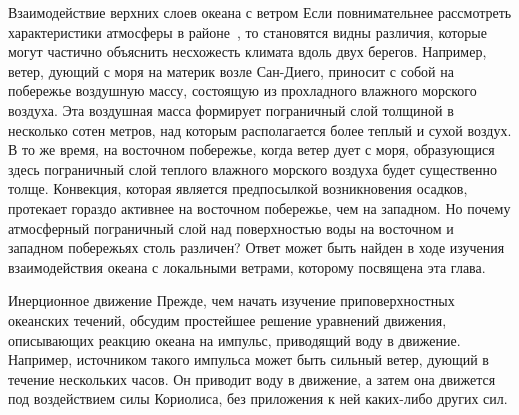 \begin{chapter}{Взаимодействие верхних слоев океана с ветром}
Если повнимательнее рассмотреть характеристики атмосферы в 
районе~, то становятся видны различия, которые могут
частично объяснить несхожесть климата вдоль двух берегов. 
Например, ветер, дующий с моря на материк возле Сан-Диего, приносит с собой 
на побережье воздушную массу, состоящую из прохладного влажного 
морского воздуха. Эта воздушная масса формирует пограничный слой толщиной 
в несколько сотен метров, над которым располагается более теплый и сухой воздух. 
В то же время, на восточном побережье, когда ветер дует с
моря, образующися здесь пограничный слой теплого влажного морского 
воздуха будет существенно толще. Конвекция, которая является предпосылкой 
возникновения осадков, протекает гораздо активнее на восточном побережье, 
чем на западном. Но почему атмосферный пограничный слой над поверхностью воды 
на восточном и западном побережьях столь различен? Ответ может быть найден 
в ходе изучения взаимодействия океана с локальными ветрами, которому посвящена
эта глава.
%

\begin{section}{Инерционное движение}
Прежде, чем начать изучение приповерхностных океанских течений, 
обсудим простейшее решение уравнений движения, описывающих
реакцию океана на импульс, приводящий воду в движение. 
Например, источником такого импульса может быть сильный ветер, дующий в 
течение нескольких часов. Он приводит воду в движение, а затем она движется 
под воздействием силы Кориолиса, без приложения к ней каких-либо других сил. 
%


\end{section}
\end{chapter}
